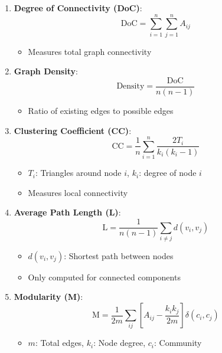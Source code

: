 \documentclass{article}
\begin{document}
\begin{enumerate}
    \item \textbf{Degree of Connectivity (DoC)}:
    \begin{equation}
        \text{DoC} = \sum_{i=1}^n \sum_{j=1}^n A_{ij}
    \end{equation}
    \begin{itemize}
        \item Measures total graph connectivity
    \end{itemize}

    \item \textbf{Graph Density}:
    \begin{equation}
        \text{Density} = \frac{\text{DoC}}{n(n-1)}
    \end{equation}
    \begin{itemize}
        \item Ratio of existing edges to possible edges
    \end{itemize}

    \item \textbf{Clustering Coefficient (CC)}:
    \begin{equation}
        \text{CC} = \frac{1}{n}\sum_{i=1}^n \frac{2T_i}{k_i(k_i-1)}
    \end{equation}
    \begin{itemize}
        \item $T_i$: Triangles around node $i$, $k_i$: degree of node $i$
        \item Measures local connectivity
    \end{itemize}

    \item \textbf{Average Path Length (L)}:
    \begin{equation}
        \text{L} = \frac{1}{n(n-1)}\sum_{i\neq j}d(v_i,v_j)
    \end{equation}
    \begin{itemize}
        \item $d(v_i,v_j)$: Shortest path between nodes
        \item Only computed for connected components
    \end{itemize}

    \item \textbf{Modularity (M)}:
    \begin{equation}
        \text{M} = \frac{1}{2m}\sum_{ij}\left[A_{ij} - \frac{k_ik_j}{2m}\right]\delta(c_i,c_j)
    \end{equation}
    \begin{itemize}
        \item $m$: Total edges, $k_i$: Node degree, $c_i$: Community
    \end{itemize}


\end{enumerate}
\end{document}
